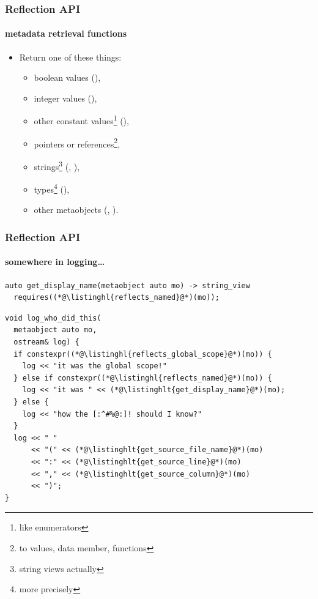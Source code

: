 \documentclass[compress,table,xcolor=table]{beamer}
\begin{document}
\begin{frame}
  \frametitle{Reflection API}
  \framesubtitle{metadata retrieval functions}
  \larger
  \begin{itemize}
  \item Return one of these things:
    \begin{itemize}
      \smaller
      \item boolean values (),
      \item integer values (),
      \item other constant values\footnote{like enumerators} (),
      \item pointers or references\footnote{to values, data member, functions},
      \item strings\footnote{string views actually} (,
        ),
      \item types\footnote{more precisely }
        (),
      \item other metaobjects (, ).
    \end{itemize}
  \end{itemize}
\end{frame}
\begin{frame}[fragile]
  \frametitle{Reflection API}
  \framesubtitle{somewhere in logging\ldots}
  \begin{lstlisting}[language=c++2x,basicstyle=\scriptsize\ttfamily]
auto get_display_name(metaobject auto mo) -> string_view
  requires((*@\listinghl{reflects_named}@*)(mo));
  \end{lstlisting}
  \begin{lstlisting}[language=c++2x,basicstyle=\footnotesize\ttfamily]
void log_who_did_this(
  metaobject auto mo,
  ostream& log) {
  if constexpr((*@\listinghl{reflects_global_scope}@*)(mo)) {
    log << "it was the global scope!"
  } else if constexpr((*@\listinghl{reflects_named}@*)(mo)) {
    log << "it was " << (*@\listinghlt{get_display_name}@*)(mo);
  } else {
    log << "how the [:^#%@:]! should I know?"
  }
  log << " "
      << "(" << (*@\listinghlt{get_source_file_name}@*)(mo)
      << ":" << (*@\listinghlt{get_source_line}@*)(mo)
      << "," << (*@\listinghlt{get_source_column}@*)(mo)
      << ")";
}
  \end{lstlisting}
\end{frame}
\end{document}
